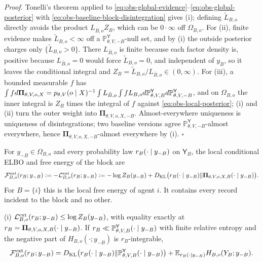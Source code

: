 \noindent\emph{Proof.}
Tonelli's theorem applied to
\eqref{eq:obs-global-evidence}--\eqref{eq:obs-global-posterior} with
\eqref{eq:obs-baseline-block-disintegration} gives (i); defining $\widetilde L_{B,o}$ directly avoids the product
$L_{\bar B,o}Z_B$, which can be $0\cdot\infty$ off $\Omega_{B,o}$. For (ii),
finite evidence makes $\widetilde L_{B,o}<\infty$ off a
$\mathbb P^{\mathsf Y}_{\theta,V,-B}$-null set, and by (i) the outside posterior
charges only $\{\widetilde L_{B,o}>0\}$. There $L_{\bar B,o}$ is finite because
each factor density is, positive because $L_{\bar B,o}=0$ would force
$\widetilde L_{B,o}=0$, and independent of $y_B$, so it leaves the conditional
integral and $Z_B=\widetilde L_{B,o}/L_{\bar B,o}\in(0,\infty)$. For (iii), a
bounded measurable $f$ has
$\int fd\boldsymbol\Pi_{\theta,V,o,X}
=p_{\theta,V}(o\mid X)^{-1}\int L_{\bar B,o}\int fL_{B,o}d\mathbb P^{\mathsf Y}_{\theta,V,B}d\mathbb P^{\mathsf Y}_{\theta,V,-B}$,
and on $\Omega_{B,o}$ the inner integral is $Z_B$ times the integral of $f$
against \eqref{eq:obs-local-posterior}; (i) and (ii) turn the outer weight into
$\boldsymbol\Pi_{\theta,V,o,X,-B}$. Almost-everywhere uniqueness is uniqueness
of disintegrations; two baseline versions agree
$\mathbb P^{\mathsf Y}_{\theta,V,-B}$-almost everywhere, hence
$\boldsymbol\Pi_{\theta,V,o,X,-B}$-almost everywhere by (i). \hfill$\square$

For $y_{-B}\in\Omega_{B,o}$ and every probability law $r_B(\cdot\mid y_{-B})$
on $\mathsf Y_B$, the local conditional ELBO and free energy of the block are
\begin{equation}
\mathcal F^{\mathrm{ext}}_{B,o}(r_B;y_{-B}):=-\mathcal L^{\mathrm{ext}}_{B,o}(r_B;y_{-B})
:=-\log Z_B(y_{-B})
+D_{\mathrm{KL}}\bigl(r_B(\cdot\mid y_{-B})\Vert\boldsymbol\Pi_{\theta,V,o,X,B}(\cdot\mid y_{-B})\bigr).
\label{eq:obs-local-vfe}
\end{equation}
For $B=\{i\}$ this is the local free energy of agent $i$. It contains every
record incident to the block and no other.

(i) $\mathcal L^{\mathrm{ext}}_{B,o}(r_B;y_{-B})\leq\log Z_B(y_{-B})$, with
equality exactly at $r_B=\boldsymbol\Pi_{\theta,V,o,X,B}(\cdot\mid y_{-B})$.
If $r_B\ll\mathbb P^{\mathsf Y}_{\theta,V,B}(\cdot\mid y_{-B})$ with finite
relative entropy and the negative part of $H_{B,o}(\cdot;y_{-B})$ is
$r_B$-integrable,
\begin{equation}
\mathcal F^{\mathrm{ext}}_{B,o}(r_B;y_{-B})
=D_{\mathrm{KL}}\bigl(r_B(\cdot\mid y_{-B})\Vert\mathbb P^{\mathsf Y}_{\theta,V,B}(\cdot\mid y_{-B})\bigr)
+\mathbb E_{r_B(\cdot\mid y_{-B})}H_{B,o}(Y_B;y_{-B}).
\label{eq:obs-local-energy-form}
\end{equation}

